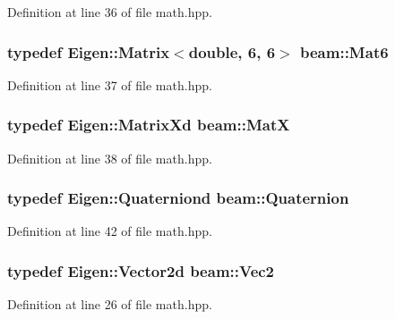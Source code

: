 Definition at line 36 of file math.\+hpp.

\subsubsection[{\texorpdfstring{Mat6}{Mat6}}]{\setlength{\rightskip}{0pt plus 5cm}typedef Eigen\+::\+Matrix$<$double, 6, 6$>$ {\bf beam\+::\+Mat6}}\hypertarget{group__utils_gac42e2f9ad085d2fcc34875015c43cecc}{}\label{group__utils_gac42e2f9ad085d2fcc34875015c43cecc}


Definition at line 37 of file math.\+hpp.

\subsubsection[{\texorpdfstring{MatX}{MatX}}]{\setlength{\rightskip}{0pt plus 5cm}typedef Eigen\+::\+Matrix\+Xd {\bf beam\+::\+MatX}}\hypertarget{group__utils_gaf1ee9917aef6e6cf513d29f8c7d2eeee}{}\label{group__utils_gaf1ee9917aef6e6cf513d29f8c7d2eeee}


Definition at line 38 of file math.\+hpp.

\subsubsection[{\texorpdfstring{Quaternion}{Quaternion}}]{\setlength{\rightskip}{0pt plus 5cm}typedef Eigen\+::\+Quaterniond {\bf beam\+::\+Quaternion}}\hypertarget{group__utils_gab34e0dc5bdfa343eebf793fdc084a07f}{}\label{group__utils_gab34e0dc5bdfa343eebf793fdc084a07f}


Definition at line 42 of file math.\+hpp.

\subsubsection[{\texorpdfstring{Vec2}{Vec2}}]{\setlength{\rightskip}{0pt plus 5cm}typedef Eigen\+::\+Vector2d {\bf beam\+::\+Vec2}}\hypertarget{group__utils_ga6112bda54e53755ab14060144285c6b0}{}\label{group__utils_ga6112bda54e53755ab14060144285c6b0}


Definition at line 26 of file math.\+hpp.

